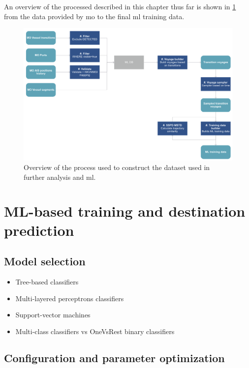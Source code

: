 An overview of the processed described in this chapter thus far is shown in \cref{fig:dataset_overview} from the data provided by \acrfull{mo} to the final \acrshort{ml} training data.

\begin{figure}[htbp]  %
    \centering
    \includegraphics[width=1.0\textwidth]{figures/dataset_overview}
    \caption{Overview of the process used to construct the dataset used in further analysis and \acrshort{ml}.}
    \label{fig:dataset_overview}
\end{figure}


\section{ML-based training and destination prediction}

\subsection{Model selection}

\begin{itemize}
    \item Tree-based classifiers
    \item Multi-layered perceptrons classifiers
    \item Support-vector machines
    \item Multi-class classifiers vs OneVsRest binary classifiers
\end{itemize}

\subsection{Configuration and parameter optimization}

